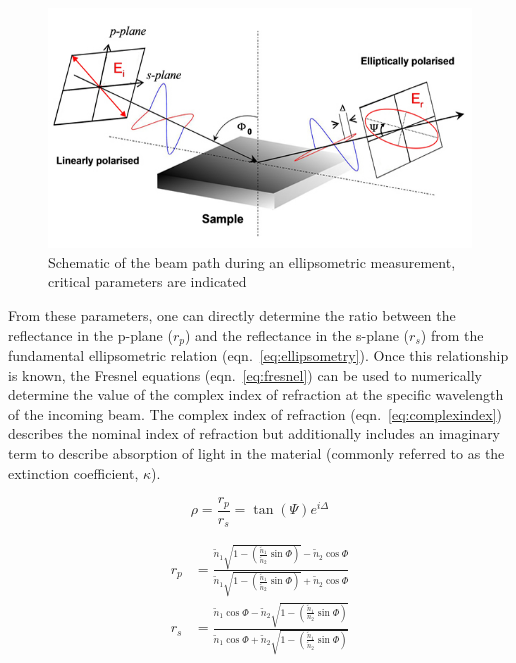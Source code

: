 \begin{figure}[tb]
   \centering
   \includegraphics[width=\linewidth]{./figures/characterization/ellipsometryDiagram_simple} 
   \caption[Ellipsometric Beam Path and Modeling Parameters]{Schematic of the beam path during an %
   					ellipsometric measurement, \\ critical parameters are indicated}
   \label{fig:ellipsometry}
\end{figure}

From these parameters, one can directly determine the ratio between the reflectance in the p-plane ($r_{p}$) and the reflectance in the s-plane ($r_{s}$) from the fundamental ellipsometric relation (eqn.~\vref{eq:ellipsometry}).  Once this relationship is known, the Fresnel equations (eqn.~\vref{eq:fresnel}) can be used to numerically determine the value of the complex index of refraction at the specific wavelength of the incoming beam. The complex index of refraction (eqn.~\vref{eq:complexindex}) describes the nominal index of refraction but additionally includes an imaginary term to describe absorption of light in the material (commonly referred to as the extinction coefficient, $\kappa$).  

\begin{equation}
 \label{eq:ellipsometry}
 \displaystyle
	\rho = \frac{r_{p}}{r_{s}} = \tan(\Psi)e^{i\Delta}
\end{equation}

\begin{subequations}
\label{eq:fresnel}
\begin{align}
	r_{p} &= \frac{\tilde{n}_{1}\sqrt{1- \left(\frac{\tilde{n}_{1}}{\tilde{n}_{2}}\sin\Phi\right)} - \tilde{n}_{2}%
			\cos\Phi}{\tilde{n}_{1}\sqrt{1- \left(\frac{\tilde{n}_{1}}{\tilde{n}_{2}}\sin\Phi\right)} + %
			\tilde{n}_{2}\cos\Phi} \\
        	r_{s} &= \frac{\tilde{n}_{1}\cos\Phi - \tilde{n}_{2}\sqrt{1- \left(\frac{\tilde{n}_{1}}{n_{2}}\sin\Phi\right)}}%
			{\tilde{n}_{1}\cos\Phi + \tilde{n}_{2}\sqrt{1- \left(\frac{\tilde{n}_{1}}{\tilde{n}_{2}}\sin\Phi\right)}}
\end{align}
\end{subequations}


